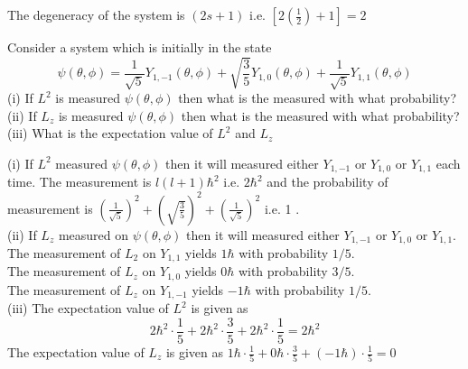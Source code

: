 \begin{enumerate}
\begin{answer}
	The degeneracy of the system is $(2 s+1)$ i.e. $\left[2\left(\frac{1}{2}\right)+1\right]=2$	
\end{answer}
	\begin{minipage}{\textwidth}
	\item 	Consider a system which is initially in the state
	$$
	\psi(\theta, \phi)=\frac{1}{\sqrt{5}} Y_{1,-1}(\theta, \phi)+\sqrt{\frac{3}{5}} Y_{1,0}(\theta, \phi)+\frac{1}{\sqrt{5}} Y_{1,1}(\theta, \phi)
	$$
	(i) If $L^{2}$ is measured $\psi(\theta, \phi)$ then what is the measured with what probability?\\
	(ii) If $L_{z}$ is measured $\psi(\theta, \phi)$ then what is the measured with what probability?\\
	(iii) What is the expectation value of $L^{2}$ and $L_{z}$
\end{minipage}
\begin{answer}
	(i) If $L^{2}$ measured $\psi(\theta, \phi)$ then it will measured either $Y_{1,-1}$ or $Y_{1,0}$ or $Y_{1,1}$ each time. The measurement is $l(l+1) \hbar^{2}$ i.e. $2 \hbar^{2}$ and the probability of measurement is $\left(\frac{1}{\sqrt{5}}\right)^{2}+\left(\sqrt{\frac{3}{5}}\right)^{2}+\left(\frac{1}{\sqrt{5}}\right)^{2}$ i.e. 1 .\\
	(ii) If $L_{z}$ measured on $\psi(\theta, \phi)$ then it will measured either $Y_{1,-1}$ or $Y_{1,0}$ or $Y_{1,1}$.\\
	The measurement of $L_{2}$ on $Y_{1,1}$ yields $1 \hbar$ with probability $1 / 5$.\\
	The measurement of $L_{z}$ on $Y_{1,0}$ yields $0 \hbar$ with probability $3 / 5$.\\
	The measurement of $L_{z}$ on $Y_{1,-1}$ yields $-1 \hbar$ with probability $1 / 5$.\\
	(iii) The expectation value of $L^{2}$ is given as
	$$
	2 \hbar^{2} \cdot \frac{1}{5}+2 \hbar^{2} \cdot \frac{3}{5}+2 \hbar^{2} \cdot \frac{1}{5}=2 \hbar^{2}
	$$
	The expectation value of $L_{z}$ is given as $1 \hbar \cdot \frac{1}{5}+0 \hbar \cdot \frac{3}{5}+(-1 \hbar) \cdot \frac{1}{5}=0$
\end{answer}
\end{enumerate}





